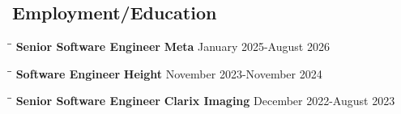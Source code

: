 \documentclass{res}
\begin{document}
 
\thispagestyle{empty} %
\address{\url{https://github.com/ksiondag}\\
  ksiondag846@gmail.com\\
  (929) 726-6214\\
  Brooklyn, NY}


\begin{resume}

    \section{Employment/Education}
    \vspace{-0.1in}
    \begin{tabbing}
    \hspace{2.2in}\= \hspace{2.2in}\= \kill
    {\bf Senior Software Engineer} \> {\bf Meta}     \>January 2025-August 2026
    \end{tabbing}\vspace{-5pt}

    \vspace{-20pt}\begin{tabbing}
    \hspace{2.2in}\= \hspace{2.2in}\= \kill
    {\bf Software Engineer} \> {\bf Height}     \>November 2023-November 2024
    \end{tabbing}\vspace{-5pt}

    \vspace{-20pt}\begin{tabbing}
    \hspace{2.2in}\= \hspace{2.2in}\= \kill
    {\bf Senior Software Engineer} \> {\bf Clarix Imaging}     \>December 2022-August 2023
    \end{tabbing}\vspace{-5pt}
  

\end{resume}
\end{document}

